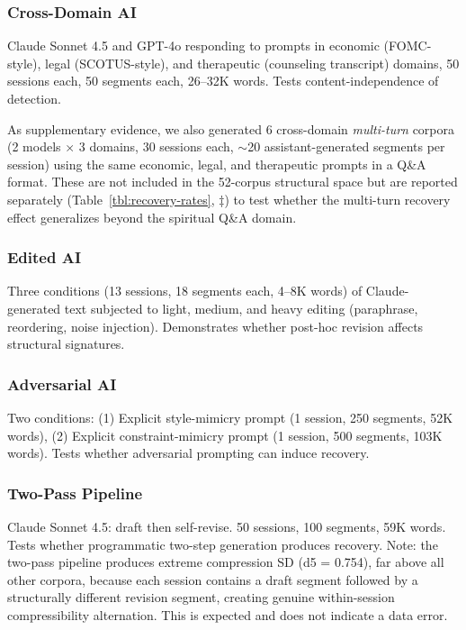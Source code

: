 \documentclass[11pt]{article}
\begin{document}
\subsubsection{Cross-Domain AI}

Claude Sonnet 4.5 and GPT-4o responding to prompts in economic (FOMC-style), legal (SCOTUS-style), and therapeutic (counseling transcript) domains, 50 sessions each, 50 segments each, 26--32K words. Tests content-independence of detection.

As supplementary evidence, we also generated 6 cross-domain \textit{multi-turn} corpora (2 models $\times$ 3 domains, 30 sessions each, $\sim$20 assistant-generated segments per session) using the same economic, legal, and therapeutic prompts in a Q\&A format. These are not included in the 52-corpus structural space but are reported separately (Table~\ref{tbl:recovery-rates}, $\ddagger$) to test whether the multi-turn recovery effect generalizes beyond the spiritual Q\&A domain.

\subsubsection{Edited AI}

Three conditions (13 sessions, 18 segments each, 4--8K words) of Claude-generated text subjected to light, medium, and heavy editing (paraphrase, reordering, noise injection). Demonstrates whether post-hoc revision affects structural signatures.

\subsubsection{Adversarial AI}

Two conditions: (1) Explicit style-mimicry prompt (1 session, 250 segments, 52K words), (2) Explicit constraint-mimicry prompt (1 session, 500 segments, 103K words). Tests whether adversarial prompting can induce recovery.

\subsubsection{Two-Pass Pipeline}

Claude Sonnet 4.5: draft then self-revise. 50 sessions, 100 segments, 59K words. Tests whether programmatic two-step generation produces recovery. Note: the two-pass pipeline produces extreme compression SD (d5 = 0.754), far above all other corpora, because each session contains a draft segment followed by a structurally different revision segment, creating genuine within-session compressibility alternation. This is expected and does not indicate a data error.
\end{document}
